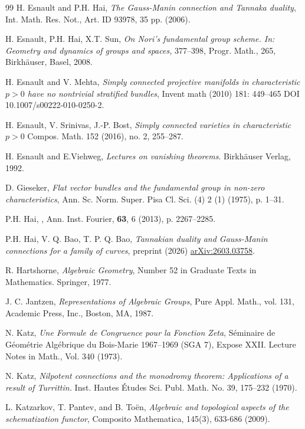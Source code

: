 \documentclass[12pt,a4]{amsart}
\theoremstyle{definition}
\begin{document}
\begin{thebibliography}{99}
 H. Esnault and P.H. Hai,  \textit{The Gauss-Manin connection and Tannaka duality}, Int. Math. Res. Not., Art. ID 93978, 35 pp. (2006). 

 H. Esnault, P.H. Hai, X.T. Sun, 
\textit{On Nori's fundamental group scheme. In: Geometry and dynamics of groups and spaces,}
 377--398, Progr. Math., 265, Birkh\"auser, Basel, 2008.

 H. Esnault and V. Mehta, 
\textit{Simply connected projective manifolds
in characteristic $p>0$ have no nontrivial stratified bundles}, Invent math (2010) 181: 449--465
DOI 10.1007/s00222-010-0250-2.

 H. Esnault, V. Srinivas, J.-P. Bost, \textit{ Simply connected varieties in characteristic  $p>0$} 
Compos. Math. 152 (2016), no. 2, 255--287.

 H. Esnault and  E.Viehweg,
\textit{Lectures on vanishing theorems}. Birkh\"auser Verlag, 1992.

 D. Gieseker, \textit{Flat vector bundles and the fundamental group in non-zero characteristics}, Ann. Sc.  Norm. Super. Pisa Cl. Sci. (4) 2 (1) (1975), p. 1--31. 

 P.H. Hai, , Ann. Inst. Fourier,  {\bf 63}, 6 (2013), p. 2267--2285.  

 P.H. Hai, V. Q. Bao,  T. P. Q. Bao, 
\textit{Tannakian duality and Gauss-Manin connections for a family of curves}, preprint (2026)  \url{arXiv:2603.03758}.
 
R. Hartshorne, \textit{Algebraic Geometry}, Number 52 in Graduate Texts in Mathematics. Springer, 1977.
 

 J. C. Jantzen, \emph{Representations of Algebraic Groups}, Pure Appl. Math., vol. 131, Academic Press, Inc., Boston, MA, 1987.
 
 N. Katz, \textit{Une Formule de Congruence pour la Fonction Zeta},
S\'eminaire de G\'eom\'etrie Alg\'ebrique du Bois-Marie 1967--1969 (SGA 7), Expose XXII.   
Lecture Notes in Math., Vol. 340 (1973).   
 
 N. Katz, \emph{Nilpotent connections and the monodromy theorem: Applications of a result of Turrittin.} 
 Inst. Hautes \'Etudes Sci. Publ. Math. No. 39, 175--232 (1970).

 L. Katzarkov, T. Pantev, and B. To\"en,  \textit{Algebraic and topological aspects of the schematization functor}, Composito Mathematica, 145(3), 633-686 (2009).


\end{thebibliography}
\end{document}

